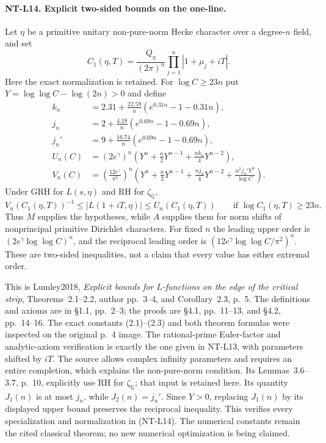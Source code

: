 \documentclass[11pt,a4paper]{article}
\begin{document}
\paragraph{NT-L14. Explicit two-sided bounds on the one-line.}
Let $\eta$ be a primitive unitary non-pure-norm Hecke character
over a degree-$n$ field, and set
\[
 C_1(\eta,T)=\frac{Q_\eta}{(2\pi)^n}
                   \prod_{j=1}^n|1+\mu_j+iT|.
\]
Here the exact normalization is retained.
For $\log C\ge23n$ put $Y=\log\log C-\log(2n)>0$ and define
\begin{align*}
 k_n&=2.31+\frac{22.59}{n}(e^{0.31n}-1-0.31n),\\
 j_n&=2+\frac{4.18}{n}(e^{0.69n}-1-0.69n),\\
 j_n'&=9+\frac{16.74}{n}(e^{0.69n}-1-0.69n),\\
 U_n(C)&=(2e^\gamma)^n
       \left(Y^n+\frac n2Y^{n-1}+\frac{nk_n}4Y^{n-2}\right),\\
 V_n(C)&=\left(\frac{12e^\gamma}{\pi^2}\right)^n
       \left(Y^n+\frac n2Y^{n-1}+\frac{nj_n}4Y^{n-2}
                         +\frac{n^2j_n'Y^n}{\log C}\right).
\end{align*}
Under GRH for $L(s,\eta)$ and RH for $\zeta_{\mathbb Q}$,
\[
  V_n(C_1(\eta,T))^{-1}
        \le |L(1+iT,\eta)|\le U_n(C_1(\eta,T))
        \qquad\text{if }\log C_1(\eta,T)\ge23n.
\tag{NT-L14}
\]
Thus $M$ supplies the hypotheses, while $A$ supplies them for
norm shifts of nonprincipal primitive Dirichlet characters.
For fixed $n$ the leading upper order is
$(2e^\gamma\log\log C)^n$, and the reciprocal leading order
is $(12e^\gamma\log\log C/\pi^2)^n$.
These are two-sided inequalities, not a claim that every value
has either extremal order.

This is Lumley2018, \emph{Explicit bounds for $L$-functions
on the edge of the critical strip}, Theorems~2.1--2.2,
author pp.~3--4, and Corollary~2.3, p.~5.
The definitions and axioms are in \S1.1, pp.~2--3;
the proofs are \S4.1, pp.~11--13, and \S4.2, pp.~14--16.
The exact constants (2.1)--(2.3) and both theorem formulas
were inspected on the original p.~4 image.
The rational-prime Euler-factor and analytic-axiom verification
is exactly the one given in NT-L13, with parameters shifted
by $iT$.  The source allows complex infinity parameters and
requires an entire completion, which explains the non-pure-norm
condition.  Its Lemmas~3.6--3.7, p.~10, explicitly use RH for
$\zeta_{\mathbb Q}$; that input is retained here.
Its quantity $J_1(n)$ is at most $j_n$, while $J_2(n)=j_n'$.
Since $Y>0$, replacing $J_1(n)$ by its displayed upper bound
preserves the reciprocal inequality.  This verifies every
specialization and normalization in (NT-L14).
The numerical constants remain the cited classical theorem;
no new numerical optimization is being claimed.
\end{document}
